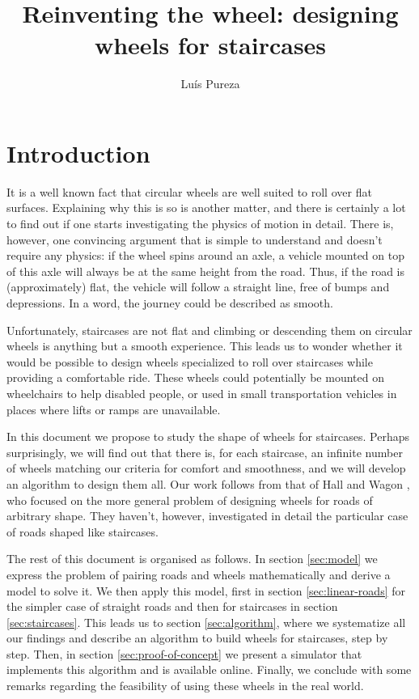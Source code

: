 \documentclass{article}
\theoremstyle{theorem}
\theoremstyle{theorem}
\begin{document}
\title{Reinventing the wheel: designing wheels for staircases} \date{}
\author{
  Luís Pureza
}
\maketitle

\section{Introduction}

It is a well known fact that circular wheels are well suited to roll
over flat surfaces. Explaining why this is so is another matter, and
there is certainly a lot to find out if one starts investigating the
physics of motion in detail. There is, however, one convincing
argument that is simple to understand and doesn't require any physics:
if the wheel spins around an axle, a vehicle mounted on top of this
axle will always be at the same height from the road. Thus, if the
road is (approximately) flat, the vehicle will follow a straight line,
free of bumps and depressions. In a word, the journey could be
described as smooth.

Unfortunately, staircases are not flat and climbing or descending them
on circular wheels is anything but a smooth experience. This leads us
to wonder whether it would be possible to design wheels specialized
to roll over staircases while providing a comfortable ride. These
wheels could potentially be mounted on wheelchairs to help disabled
people, or used in small transportation vehicles in places where lifts
or ramps are unavailable.

In this document we propose to study the shape of wheels for
staircases. Perhaps surprisingly, we will find out that there is, for each staircase, an
infinite number of wheels matching our criteria for comfort and
smoothness, and we will develop an algorithm to design them all. Our
work follows from that of Hall and Wagon \cite{hall-wagon}, who
focused on the more general problem of designing wheels for roads of
arbitrary shape. They haven't, however, investigated in detail the
particular case of roads shaped like staircases.

The rest of this document is organised as follows. In section
\ref{sec:model} we express the problem of pairing roads and wheels
mathematically and derive a model to solve it. We then apply this
model, first in section \ref{sec:linear-roads} for the simpler case of
straight roads and then for staircases in section
\ref{sec:staircases}. This leads us to section \ref{sec:algorithm},
where we systematize all our findings and describe an algorithm to
build wheels for staircases, step by step. Then, in section
\ref{sec:proof-of-concept} we present a simulator that implements this
algorithm and is available online. Finally, we conclude with some
remarks regarding the feasibility of using these wheels in the real
world.
\end{document}

